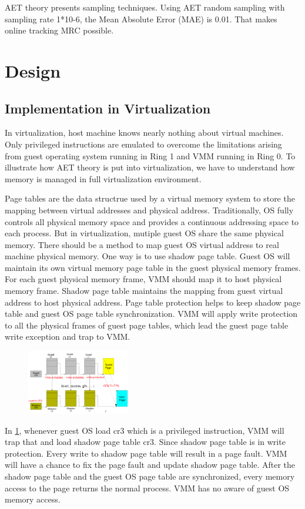 \documentclass[10pt,twocolumn]{article}
\begin{document}
AET theory presents sampling techniques. Using AET random sampling with sampling rate 1*10-6, the Mean Absolute Error (MAE) is 0.01. That makes online tracking MRC possible.

\section{Design}
\subsection{Implementation in Virtualization}
In virtualization, host machine knows nearly nothing about virtual machines. Only privileged instructions are emulated to overcome the limitations arising from guest operating system running in Ring 1 and VMM running in Ring 0\cite{MasteringKVM}. To illustrate how AET theory is put into virtualization, we have to understand how memory is managed in full virtualization environment.

Page tables are the data structrue used by a virtual memory system to store the mapping between virtual addresses and physical address. Traditionally, OS fully controls all physical memory space and provides a continuous addressing space to each process. But in virtualization, mutiple guest OS share the same physical memory. There should be a method to map guest OS virtual address to real machine physical memory. One way is to use shadow page table. Guest OS will maintain its own virtual memory page table in the guest physical memory frames. For each guest physical memory frame, VMM should map it to host physical memory frame. Shadow page table maintains the mapping from guest virtual address to host physical address. Page table protection helps to keep shadow page table and guest OS page table synchronization. VMM will apply write protection to all the physical frames of guest page tables, which lead the guest page table write exception and trap to VMM.
\begin{figure}\label{fig1}
\centering
\includegraphics[width=0.4\textwidth]{spt.png}
\end{figure}

In \ref{fig1}, whenever guest OS load cr3 which is a privileged instruction, VMM will trap that and load shadow page table cr3. Since shadow page table is in write protection. Every write to shadow page table will result in a page fault. VMM will have a chance to fix the page fault and update shadow page table. After the shadow page table and the guest OS page table are synchronized, every memory access to the page returns the normal process. VMM has no aware of guest OS memory access.
\end{document}

